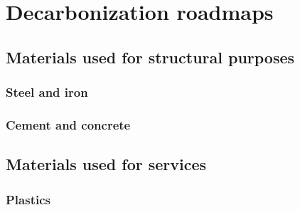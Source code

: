 \section{Decarbonization roadmaps}
\label{sec:decarbonization_roadmaps}

\subsection{Materials used for structural purposes}
\label{sec:materials_used_for_structural_purposes}

\subsubsection{Steel and iron}
\label{sec:steel_and_iron}

\subsubsection{Cement and concrete}
\label{sec:cement_and_concrete}

\subsection{Materials used for services}
\label{sec:materials_used_for_services}

\subsubsection{Plastics}
\label{sec:plastics}

